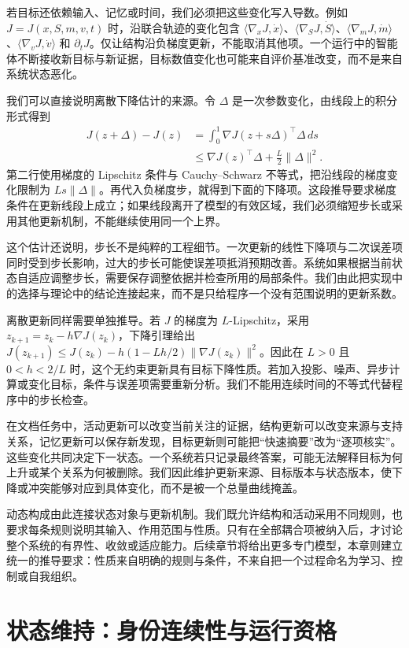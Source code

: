 若目标还依赖输入、记忆或时间，我们必须把这些变化写入导数。例如 $J=J(x,S,m,v,t)$ 时，沿联合轨迹的变化包含 $\langle\nabla_xJ,\dot x\rangle$、$\langle\nabla_SJ,\dot S\rangle$、$\langle\nabla_mJ,\dot m\rangle$、$\langle\nabla_vJ,\dot v\rangle$ 和 $\partial_tJ$。仅让结构沿负梯度更新，不能取消其他项。一个运行中的智能体不断接收新目标与新证据，目标数值变化也可能来自评价基准改变，而不是来自系统状态恶化。

我们可以直接说明离散下降估计的来源。令 $\Delta$ 是一次参数变化，由线段上的积分形式得到
\begin{align}
 J(z+\Delta)-J(z)
 &=\int_0^1\nabla J(z+s\Delta)^\top\Delta\,ds\\
 &\leq\nabla J(z)^\top\Delta+\frac L2\|\Delta\|^2.
\end{align}
第二行使用梯度的 Lipschitz 条件与 Cauchy--Schwarz 不等式，把沿线段的梯度变化限制为 $Ls\|\Delta\|$。再代入负梯度步，就得到下面的下降项。这段推导要求梯度条件在更新线段上成立；如果线段离开了模型的有效区域，我们必须缩短步长或采用其他更新机制，不能继续使用同一个上界。

这个估计还说明，步长不是纯粹的工程细节。一次更新的线性下降项与二次误差项同时受到步长影响，过大的步长可能使误差项抵消预期改善。系统如果根据当前状态自适应调整步长，需要保存调整依据并检查所用的局部条件。我们由此把实现中的选择与理论中的结论连接起来，而不是只给程序一个没有范围说明的更新系数。

离散更新同样需要单独推导。若 $J$ 的梯度为 $L$-Lipschitz，采用 $z_{k+1}=z_k-h\nabla J(z_k)$，下降引理给出 $J(z_{k+1})\leq J(z_k)-h(1-Lh/2)\|\nabla J(z_k)\|^2$。因此在 $L>0$ 且 $0<h<2/L$ 时，这个无约束更新具有目标下降性质。若加入投影、噪声、异步计算或变化目标，条件与误差项需要重新分析。我们不能用连续时间的不等式代替程序中的步长检查。

在文档任务中，活动更新可以改变当前关注的证据，结构更新可以改变来源与支持关系，记忆更新可以保存新发现，目标更新则可能把“快速摘要”改为“逐项核实”。这些变化共同决定下一状态。一个系统若只记录最终答案，可能无法解释目标为何上升或某个关系为何被删除。我们因此维护更新来源、目标版本与状态版本，使下降或冲突能够对应到具体变化，而不是被一个总量曲线掩盖。

动态构成由此连接状态对象与更新机制。我们既允许结构和活动采用不同规则，也要求每条规则说明其输入、作用范围与性质。只有在全部耦合项被纳入后，才讨论整个系统的有界性、收敛或适应能力。后续章节将给出更多专门模型，本章则建立统一的推导要求：性质来自明确的规则与条件，不来自把一个过程命名为学习、控制或自我组织。

\section{状态维持：身份连续性与运行资格}
\label{sec:existence_criterion}

